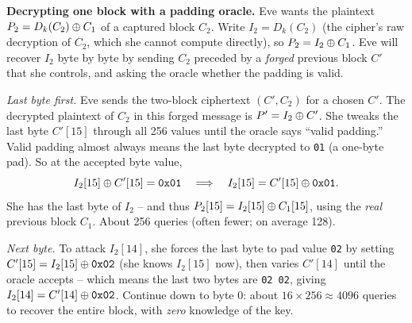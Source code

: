 \begin{attackbox}
\textbf{Decrypting one block with a padding oracle.} Eve wants the plaintext $P_2 = D_k(C_2) \oplus C_1$ of a captured block $C_2$. Write $I_2 = D_k(C_2)$ (the cipher's raw decryption of $C_2$, which she cannot compute directly), so $P_2 = I_2 \oplus C_1$. Eve will recover $I_2$ byte by byte by sending $C_2$ preceded by a \emph{forged} previous block $C'$ that she controls, and asking the oracle whether the padding is valid.

\emph{Last byte first.} Eve sends the two-block ciphertext $(C', C_2)$ for a chosen $C'$. The decrypted plaintext of $C_2$ in this forged message is $P' = I_2 \oplus C'$. She tweaks the last byte $C'[15]$ through all 256 values until the oracle says ``valid padding.'' Valid padding almost always means the last byte decrypted to \texttt{01} (a one-byte pad). So at the accepted byte value,
\[
I_2[15] \oplus C'[15] = \texttt{0x01} \quad\Longrightarrow\quad I_2[15] = C'[15] \oplus \texttt{0x01}.
\]
She has the last byte of $I_2$ -- and thus $P_2[15] = I_2[15] \oplus C_1[15]$, using the \emph{real} previous block $C_1$. About 256 queries (often fewer; on average 128).

\emph{Next byte.} To attack $I_2[14]$, she forces the last byte to pad value \texttt{02} by setting $C'[15] = I_2[15] \oplus \texttt{0x02}$ (she knows $I_2[15]$ now), then varies $C'[14]$ until the oracle accepts -- which means the last two bytes are \texttt{02 02}, giving $I_2[14] = C'[14] \oplus \texttt{0x02}$. Continue down to byte 0: about $16 \times 256 \approx 4096$ queries to recover the entire block, with \emph{zero} knowledge of the key.
\end{attackbox}

